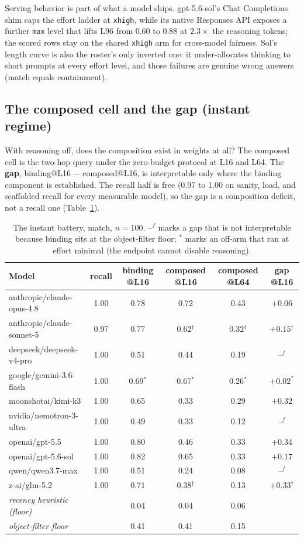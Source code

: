 \documentclass[11pt]{article}
\newcommand{\markdag}{$^{\dagger}$}
\newcommand{\floorgap}{--$^{f}$}
\newcommand{\code}[1]{\texttt{#1}}
\begin{document}
Serving behavior is part of what a model ships. gpt-5.6-sol's Chat Completions shim caps the
effort ladder at \code{xhigh}, while its native Responses API exposes a further \code{max}
level that lifts L96 from 0.60 to 0.88 at $2.3\times$ the reasoning tokens; the scored rows
stay on the shared \code{xhigh} arm for cross-model fairness. Sol's length curve is also the
roster's only inverted one: it under-allocates thinking to short prompts at every effort
level, and those failures are genuine wrong answers (match equals containment).

\subsection{The composed cell and the gap (instant regime)}

With reasoning off, does the composition exist in weights at all? The composed cell is the
two-hop query under the zero-budget protocol at L16 and L64. The \textbf{gap},
binding@L16 $-$ composed@L16, is interpretable only where the binding component is
established. The recall half is free (0.97 to 1.00 on sanity, load, and scaffolded recall for
every measurable model), so the gap is a composition deficit, not a recall one
(Table~\ref{tab:gap}).

\begin{table}[h]
\centering
\small
\begin{tabular}{lccccc}
\toprule
Model & recall & binding @L16 & composed @L16 & composed @L64 & gap @L16 \\
\midrule
anthropic/claude-opus-4.8 & 1.00 & 0.78 & 0.72 & 0.43 & $+0.06$ \\
anthropic/claude-sonnet-5 & 0.97 & 0.77 & 0.62\markdag & 0.32\markdag & $+0.15$\markdag \\
deepseek/deepseek-v4-pro & 1.00 & 0.51 & 0.44 & 0.19 & \floorgap \\
google/gemini-3.6-flash & 1.00 & 0.69$^{*}$ & 0.67$^{*}$ & 0.26$^{*}$ & $+0.02^{*}$ \\
moonshotai/kimi-k3 & 1.00 & 0.65 & 0.33 & 0.29 & $+0.32$ \\
nvidia/nemotron-3-ultra & 1.00 & 0.49 & 0.33 & 0.12 & \floorgap \\
openai/gpt-5.5 & 1.00 & 0.80 & 0.46 & 0.33 & $+0.34$ \\
openai/gpt-5.6-sol & 1.00 & 0.82 & 0.65 & 0.33 & $+0.17$ \\
qwen/qwen3.7-max & 1.00 & 0.51 & 0.24 & 0.08 & \floorgap \\
z-ai/glm-5.2 & 1.00 & 0.71 & 0.38\markdag & 0.13 & $+0.33$\markdag \\
\midrule
\emph{recency heuristic (floor)} & & 0.04 & 0.04 & 0.06 & \\
\emph{object-filter floor} & & 0.41 & 0.41 & 0.15 & \\
\bottomrule
\end{tabular}
\caption{The instant battery, match, $n=100$. \floorgap{} marks a gap that is not
interpretable because binding sits at the object-filter floor; $^{*}$ marks an off-arm that
ran at effort minimal (the endpoint cannot disable reasoning).}
\label{tab:gap}
\end{table}
\end{document}

